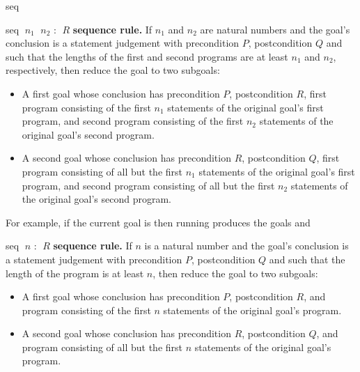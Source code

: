 \begin{tactic}{seq}
  \begin{tsyntax}{seq $\;n_1$ $\;n_2$ : $\;R$}
    \textbf{\prhl sequence rule.} If $n_1$ and $n_2$ are natural
    numbers and the goal's conclusion is a \prhl statement judgement
    with precondition $P$, postcondition $Q$ and such that the lengths
    of the first and second programs are at least $n_1$ and $n_2$,
    respectively, then reduce the goal to two subgoals:
    \begin{itemize}
    \item A first goal whose conclusion has precondition $P$,
      postcondition $R$, first program consisting of the first $n_1$
      statements of the original goal's first program, and second
      program consisting of the first $n_2$ statements of the original
      goal's second program.

    \item A second goal whose conclusion has precondition $R$,
      postcondition $Q$, first program consisting of all but the first
      $n_1$ statements of the original goal's first program, and
      second program consisting of all but the first $n_2$ statements
      of the original goal's second program.
    \end{itemize}

  \bigskip
  For example, if the current goal is
   then
  running 
  produces the goals
  and
  \end{tsyntax}

  \begin{tsyntax}{seq $\;n$ : $\;R$}
  \textbf{\phl sequence rule.} If $n$ is a natural
    number and the goal's conclusion is a \phl statement judgement
    with precondition $P$, postcondition $Q$ and such that the length
    of the program is at least $n$, then reduce the goal to two subgoals:
    \begin{itemize}
    \item A first goal whose conclusion has precondition $P$,
      postcondition $R$, and program consisting of the first $n$
      statements of the original goal's program.

    \item A second goal whose conclusion has precondition $R$,
      postcondition $Q$, and program consisting of all but the first
      $n$ statements of the original goal's program.
    \end{itemize}


\end{tsyntax}
\end{tactic}
